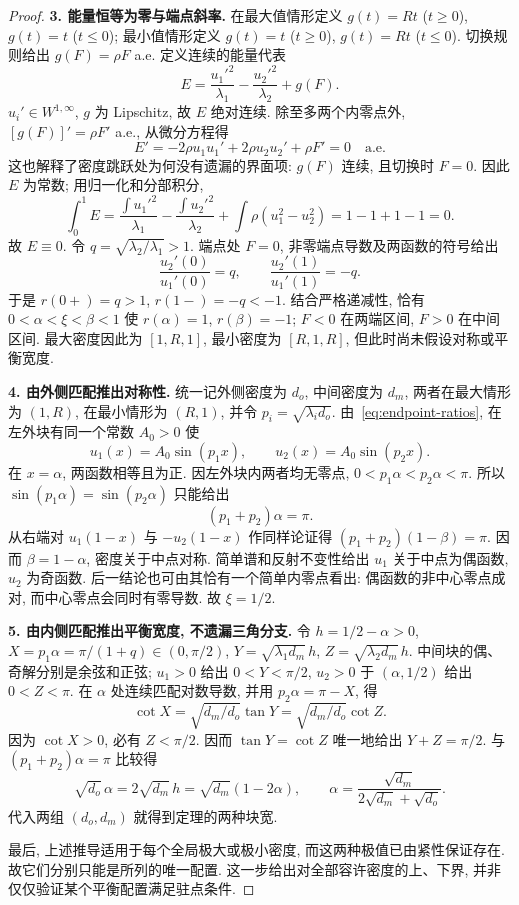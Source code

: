 \documentclass[UTF8]{ctexart}
\begin{document}
\begin{proof}
\textbf{3. 能量恒等为零与端点斜率.}
在最大值情形定义 $g(t)=Rt$ ($t\geq0$), $g(t)=t$ ($t\leq0$);
最小值情形定义 $g(t)=t$ ($t\geq0$), $g(t)=Rt$ ($t\leq0$).
切换规则给出 $g(F)=\rho F$ a.e. 定义连续的能量代表
\begin{equation}\label{eq:zero-energy}
 E=\frac{u_1'^2}{\lambda_1}-\frac{u_2'^2}{\lambda_2}+g(F).
\end{equation}
$u_i'\in W^{1,\infty}$, $g$ 为 Lipschitz, 故 $E$ 绝对连续.
除至多两个内零点外, $[g(F)]'=\rho F'$ a.e., 从微分方程得
\[
 E'=-2\rho u_1u_1'+2\rho u_2u_2'+\rho F'=0\quad\text{a.e.}
\]
这也解释了密度跳跃处为何没有遗漏的界面项: $g(F)$ 连续, 且切换时 $F=0$.
因此 $E$ 为常数; 用归一化和分部积分,
\[
 \int_0^1E=\frac{\int u_1'^2}{\lambda_1}
 -\frac{\int u_2'^2}{\lambda_2}+\int\rho(u_1^2-u_2^2)=1-1+1-1=0.
\]
故 $E\equiv0$. 令 $q=\sqrt{\lambda_2/\lambda_1}>1$.
端点处 $F=0$, 非零端点导数及两函数的符号给出
\begin{equation}\label{eq:endpoint-ratios}
 \frac{u_2'(0)}{u_1'(0)}=q,\qquad
 \frac{u_2'(1)}{u_1'(1)}=-q.
\end{equation}
于是 $r(0+)=q>1$, $r(1-)=-q<-1$.
结合严格递减性, 恰有 $0<\alpha<\xi<\beta<1$ 使 $r(\alpha)=1$,
$r(\beta)=-1$; $F<0$ 在两端区间, $F>0$ 在中间区间.
最大密度因此为 $[1,R,1]$, 最小密度为 $[R,1,R]$, 但此时尚未假设对称或平衡宽度.

\textbf{4. 由外侧匹配推出对称性.}
统一记外侧密度为 $d_o$, 中间密度为 $d_m$, 两者在最大情形为 $(1,R)$,
在最小情形为 $(R,1)$, 并令 $p_i=\sqrt{\lambda_i d_o}$.
由~\eqref{eq:endpoint-ratios}, 在左外块有同一个常数 $A_0>0$ 使
\[
 u_1(x)=A_0\sin(p_1x),\qquad u_2(x)=A_0\sin(p_2x).
\]
在 $x=\alpha$, 两函数相等且为正. 因左外块内两者均无零点,
$0<p_1\alpha<p_2\alpha<\pi$.
所以 $\sin(p_1\alpha)=\sin(p_2\alpha)$ 只能给出
\[
 (p_1+p_2)\alpha=\pi.
\]
从右端对 $u_1(1-x)$ 与 $-u_2(1-x)$ 作同样论证得
$(p_1+p_2)(1-\beta)=\pi$. 因而 $\beta=1-\alpha$, 密度关于中点对称.
简单谱和反射不变性给出 $u_1$ 关于中点为偶函数, $u_2$ 为奇函数.
后一结论也可由其恰有一个简单内零点看出: 偶函数的非中心零点成对,
而中心零点会同时有零导数. 故 $\xi=1/2$.

\textbf{5. 由内侧匹配推出平衡宽度, 不遗漏三角分支.}
令 $h=1/2-\alpha>0$, $X=p_1\alpha=\pi/(1+q)\in(0,\pi/2)$,
$Y=\sqrt{\lambda_1d_m}\,h$, $Z=\sqrt{\lambda_2d_m}\,h$.
中间块的偶、奇解分别是余弦和正弦; $u_1>0$ 给出 $0<Y<\pi/2$,
$u_2>0$ 于 $(\alpha,1/2)$ 给出 $0<Z<\pi$.
在 $\alpha$ 处连续匹配对数导数, 并用 $p_2\alpha=\pi-X$, 得
\begin{equation}\label{eq:interface-phases}
 \cot X=\sqrt{d_m/d_o}\tan Y
       =\sqrt{d_m/d_o}\cot Z.
\end{equation}
因为 $\cot X>0$, 必有 $Z<\pi/2$. 因而 $\tan Y=\cot Z$ 唯一地给出
$Y+Z=\pi/2$. 与 $(p_1+p_2)\alpha=\pi$ 比较得
\[
 \sqrt{d_o}\,\alpha=2\sqrt{d_m}\,h
 =\sqrt{d_m}(1-2\alpha),\qquad
 \alpha=\frac{\sqrt{d_m}}{2\sqrt{d_m}+\sqrt{d_o}}.
\]
代入两组 $(d_o,d_m)$ 就得到定理的两种块宽.

最后, 上述推导适用于每个全局极大或极小密度, 而这两种极值已由紧性保证存在.
故它们分别只能是所列的唯一配置. 这一步给出对全部容许密度的上、下界,
并非仅仅验证某个平衡配置满足驻点条件.
\end{proof}
\end{document}
